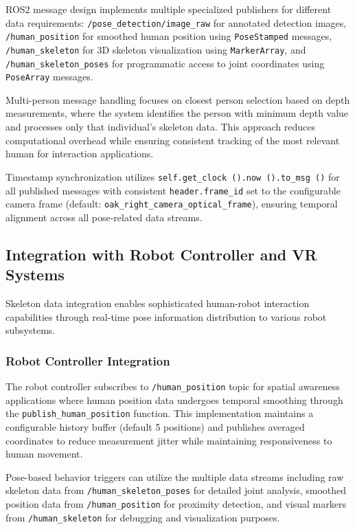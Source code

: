 ROS2 message design implements multiple specialized publishers for different data requirements: \texttt{/pose\_detection/image\_raw} for annotated detection images, \texttt{/human\_position} for smoothed human position using \texttt{PoseStamped} messages, \texttt{/human\_skeleton} for 3D skeleton visualization using \texttt{MarkerArray}, and \texttt{/human\_skeleton\_poses} for programmatic access to joint coordinates using \texttt{PoseArray} messages.

Multi-person message handling focuses on closest person selection based on depth measurements, where the system identifies the person with minimum depth value and processes only that individual's skeleton data. This approach reduces computational overhead while ensuring consistent tracking of the most relevant human for interaction applications.

Timestamp synchronization utilizes \texttt{self.get\_clock ().now ().to\_msg ()} for all published messages with consistent \texttt{header.frame\_id} set to the configurable camera frame (default: \texttt{oak\_right\_camera\_optical\_frame}), ensuring temporal alignment across all pose-related data streams.

\subsection{Integration with Robot Controller and VR Systems}

Skeleton data integration enables sophisticated human-robot interaction capabilities through real-time pose information distribution to various robot subsystems.

\subsubsection{Robot Controller Integration}

The robot controller subscribes to \texttt{/human\_position} topic for spatial awareness applications where human position data undergoes temporal smoothing through the \texttt{publish\_human\_position} function. This implementation maintains a configurable history buffer (default 5 positions) and publishes averaged coordinates to reduce measurement jitter while maintaining responsiveness to human movement.

Pose-based behavior triggers can utilize the multiple data streams including raw skeleton data from \texttt{/human\_skeleton\_poses} for detailed joint analysis, smoothed position data from \texttt{/human\_position} for proximity detection, and visual markers from \texttt{/human\_skeleton} for debugging and visualization purposes.

